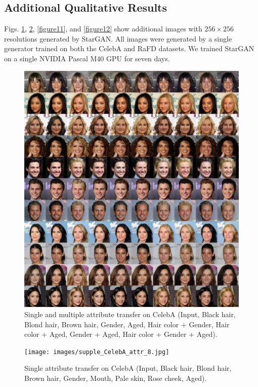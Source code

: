 \documentclass[10pt,twocolumn,letterpaper]{article}
\begin{document}
\subsection{Additional Qualitative Results} 
Figs. \ref{figure9}, \ref{figure10}, \ref{figure11}, and \ref{figure12} show additional images with $256 \times 256$ resolutions generated by StarGAN. All images were generated by a single generator trained on both the CelebA and RaFD datasets. We trained StarGAN on a single NVIDIA Pascal M40 GPU for seven days.
\begin{figure}[h]
\centering
\centerline{\includegraphics[width=1.0\linewidth]{images/supple_CelebA_single_multi.jpg}}
\caption{Single and multiple attribute transfer on CelebA (Input, Black hair, Blond hair, Brown hair, Gender, Aged, Hair color + Gender, Hair color + Aged, Gender + Aged, Hair color + Gender + Aged).}
\label{figure9}
\end{figure}

\begin{figure}[t]
\centering
\centerline{\texttt{[image: images/supple\_CelebA\_attr\_8.jpg]}}
\caption{Single attribute transfer on CelebA (Input, Black hair, Blond hair, Brown hair, Gender, Mouth, Pale skin, Rose cheek, Aged).}
\label{figure10}
\end{figure}
\end{document}
